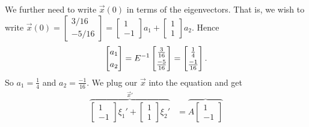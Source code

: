 \documentclass{ximera}
\begin{document}
\begin{exampleSol}
    We further need to write $\vec{x}(0)$ in terms of the eigenvectors. That is, we wish to write 
    $\vec{x}(0) = 
    \left[ \begin{smallmatrix}
        3/16 \\
        -5/16
    \end{smallmatrix} \right] 
    = 
    \left[ \begin{smallmatrix}
        1 \\
        -1
    \end{smallmatrix} \right] 
    a_1 +
    \left[ \begin{smallmatrix}
        1 \\
        1
    \end{smallmatrix} \right] 
    a_2$.  Hence
    \begin{equation*}
    \begin{bmatrix}
        a_1 \\
        \noalign{\smallskip}
        a_2
    \end{bmatrix} = 
    E^{-1}
    \begin{bmatrix}
        \frac{3}{16} \\
        \noalign{\smallskip}
        \frac{-5}{16}
    \end{bmatrix}
    =
    \begin{bmatrix}
        \frac{1}{4} \\
        \noalign{\smallskip}
        \frac{-1}{16}
    \end{bmatrix} .
    \end{equation*}
    So $a_1 = \frac{1}{4}$ and $a_2 = \frac{-1}{16}$. We plug our $\vec{x}$ into the equation and get
    \begin{equation*}
        \begin{split}
            \overbrace{
                \begin{bmatrix}
                    1 \\
                    -1
                \end{bmatrix} 
                \xi_1' +
                \begin{bmatrix}
                    1 \\
                    1
                \end{bmatrix} 
                \xi_2'
            }^{\vec{x}'}
            & = 
            \overbrace{ A
                \begin{bmatrix}
                    1 \\
                    -1
                \end{bmatrix} 
}
\end{split}
\end{equation*}
\end{exampleSol}
\end{document}
